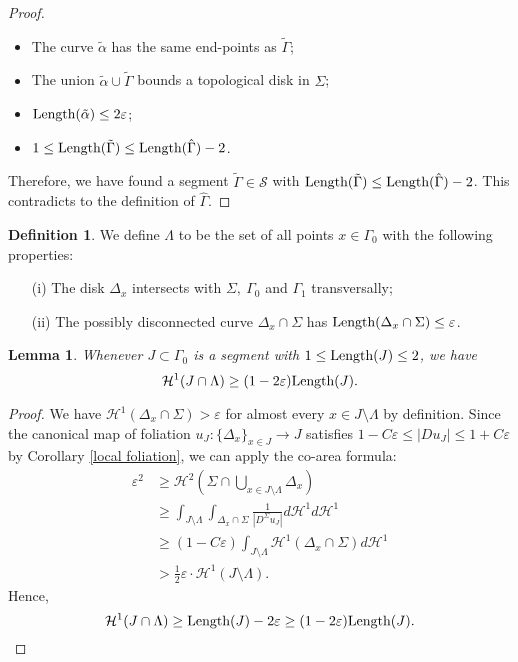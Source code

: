 \documentclass[a4paper, reqno]{amsart}
\newtheorem{lemma}[theorem]{Lemma}
\theoremstyle{definition}
\newtheorem{definition}{Definition}[section]
\theoremstyle{remark}
\numberwithin{equation}{section}
\newcommand{\Len}{\textup{Length}}
\numberwithin{equation}{section}
\numberwithin{equation}{section}
\begin{document}
\begin{proof}
	\begin{itemize}
	\item 	The curve $\tilde{\alpha}$ has the same end-points as $\tilde{\Gamma}$;
	\item The union $\tilde{\alpha}\cup\tilde{\Gamma}$ bounds a topological disk in $\Sigma$;
	\item $\Len(\tilde{\alpha})\leq 2\varepsilon$;
	\item $1\leq \Len(\tilde{\Gamma}) \leq \Len(\hat{\Gamma}) - 2$.
	\end{itemize}
Therefore, we have found a segment $\tilde{\Gamma}\in\mathcal{S}$ with $\Len(\tilde{\Gamma}) \leq \Len(\hat{\Gamma}) - 2$. This contradicts to the definition of $\hat{\Gamma}$.

\end{proof}

\bigskip

\begin{definition} We define $\Lambda$ to be the set of all points $x\in\Gamma_0$ with the following properties:
	\begin{itemize}
		\item[(i)] The disk $\Delta_x$ intersects with $\Sigma,\ \Gamma_0$ and $\Gamma_1$ transversally;
		\item[(ii)] The possibly disconnected curve $\Delta_x\cap\Sigma$ has $\Len(\Delta_x\cap\Sigma)\leq\varepsilon$.
	\end{itemize}
\end{definition}

\bigskip

\begin{lemma}{\label{smallness outside A}}
	Whenever $J\subset\Gamma_0$ is a segment with $1\leq\Len(J)\leq 2$, we have
	\[\mathcal{H}^1(J\cap\Lambda)\geq (1 - 2\varepsilon)\Len(J).\]
\end{lemma}

\begin{proof}
We have $\mathcal{H}^1(\Delta_x\cap\Sigma) > \varepsilon$ for almost every $x\in J\setminus\Lambda$ by definition. Since the canonical map of foliation $u_{J}: \{\Delta_x\}_{x\in J}\to J$ satisfies  $1 - C\varepsilon \leq |Du_{J}| \leq 1 + C\varepsilon$ by Corollary \ref{local foliation}, we can apply the co-area formula:
\begin{align*}
		\varepsilon^2 &\geq \mathcal{H}^2( \Sigma \cap\bigcup_{x\in J\setminus\Lambda}\Delta_x)	\\
		&\geq \int_{J\setminus\Lambda}\int_{\Delta_x\cap\Sigma}\frac{1}{|D^{\Sigma}u_{J}|}d\mathcal{H}^1 d\mathcal{H}^1\\
		&\geq (1-C\varepsilon)\int_{J\setminus\Lambda}\mathcal{H}^1(\Delta_x\cap\Sigma)d\mathcal{H}^1\\
		&> \frac{1}{2}\varepsilon\cdot \mathcal{H}^1(J\setminus\Lambda).
\end{align*}
Hence,
\[ \mathcal{H}^1(J\cap\Lambda)\geq \Len(J) - 2\varepsilon \geq (1 - 2\varepsilon)\Len(J).\]
\end{proof}
\end{document}
